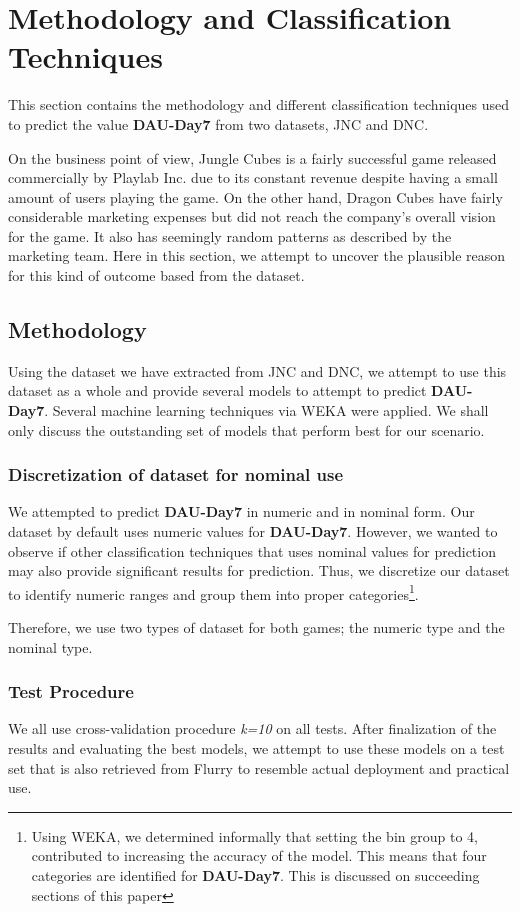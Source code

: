 \section{Methodology and Classification Techniques}
This section contains the methodology and different classification techniques used to predict the value \textbf{DAU-Day7} from two datasets, JNC and DNC.

On the business point of view, Jungle Cubes is a fairly successful game released commercially by Playlab Inc. due to its constant revenue despite having a small amount of users playing the game. On the other hand, Dragon Cubes have fairly considerable marketing expenses but did not reach the company's overall vision for the game. It also has seemingly random patterns as described by the marketing team. Here in this section, we attempt to uncover the plausible reason for this kind of outcome based from the dataset.

\subsection{Methodology}
Using the dataset we have extracted from JNC and DNC, we attempt to use this dataset as a whole and provide several models to attempt to predict \textbf{DAU-Day7}. Several machine learning techniques via WEKA were applied. We shall only discuss the outstanding set of models that perform best for our scenario.

\subsubsection{Discretization of dataset for nominal use}
We attempted to predict \textbf{DAU-Day7} in numeric and in nominal form. Our dataset by default uses numeric values for \textbf{DAU-Day7}. However, we wanted to observe if other classification techniques that uses nominal values for prediction may also provide significant results for prediction. Thus, we discretize our dataset to identify numeric ranges and group them into proper categories\footnote{Using WEKA, we determined informally that setting the bin group to 4, contributed to increasing the accuracy of the model. This means that four categories are identified for \textbf{DAU-Day7}. This is discussed on succeeding sections of this paper}. 

Therefore, we use two types of dataset for both games; the numeric type and the nominal type.

\subsubsection{Test Procedure}
We all use cross-validation procedure \textit{k=10} on all tests. After finalization of the results and evaluating the best models, we attempt to use these models on a test set that is also retrieved from Flurry to resemble actual deployment and practical use.

